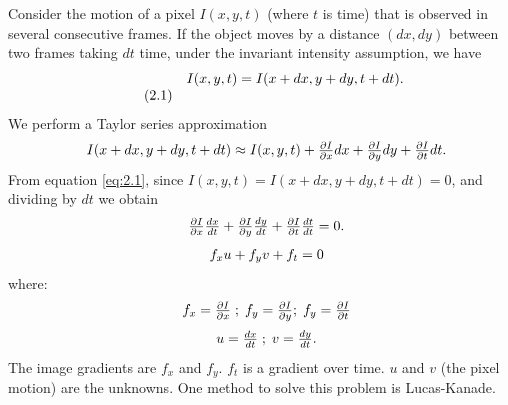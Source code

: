Consider the motion of a pixel $I(x,y,t)$ (where $t$ is time) that is observed in several consecutive frames. If the object moves by a distance $(dx,dy)$ between two frames taking $dt$ time, under the invariant intensity assumption, we have
\[
\begin{array}{lc}
  {\rm } & {I(x,y,t)} = I(x+dx,y+dy,t+dt). \\ \tag{2.1} \label{eq:2.1}
\end{array}
\]
We perform a Taylor series approximation
\[
\begin{array}{lc}
  {\rm } & {I(x+dx,y+dy,t+dt) \approx I(x,y,t) + \frac{\partial I}{\partial x}dx+\frac{\partial I}{\partial y}d y+\frac{\partial I}{\partial t}dt}.\\ 
\end{array}
\]
From equation \eqref{eq:2.1}, since ${I(x,y,t)} = I(x+dx,y+dy,t+dt) = 0$, and dividing by $dt$ we obtain
\[
\begin{array}{lc}
  {\rm } & {\frac{\partial I}{\partial x}\frac{dx}{dt}+\frac{\partial I}{\partial y}\frac{d y}{d t}+\frac{\partial I}{\partial t}\frac{dt}{dt} = 0}.\\ 
\end{array}
\]
\[
\begin{array}{lc}
  {\rm } & {f_xu + f_yv+ f_t }= 0 \\ 
\end{array}
\]
where:
\[
\begin{array}{lc}
  {\rm } & {f_x = \frac{\partial I}{\partial x} \; ; \; f_y = \frac{\partial I}{\partial y} ; \; f_y = \frac{\partial I}{\partial t}}\\ 
\end{array}
\]
\[
\begin{array}{lc}
  {\rm } & {u = \frac{dx}{dt} \; ; \; v = \frac{dy}{dt}.}\\ 
\end{array}
\]
The image gradients are $ f_x $ and $ f_y $. $ f_t $ is a gradient over time. $u$ and $v$ (the pixel motion) are the unknowns. One method to solve this problem is Lucas-Kanade.

